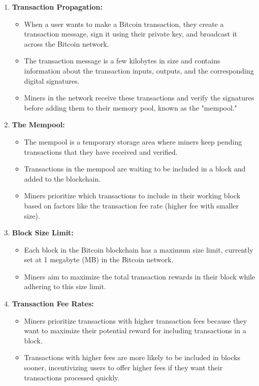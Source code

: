 \begin{enumerate}
    \item \textbf{Transaction Propagation:}
    \begin{itemize}
        \item When a user wants to make a Bitcoin transaction, they create a transaction message, sign it using their private key, and broadcast it across the Bitcoin network.
        \item The transaction message is a few kilobytes in size and contains information about the transaction inputs, outputs, and the corresponding digital signatures.
        \item Miners in the network receive these transactions and verify the signatures before adding them to their memory pool, known as the "mempool."
    \end{itemize}
    \item \textbf{The Mempool:}
    \begin{itemize}
        \item The mempool is a temporary storage area where miners keep pending transactions that they have received and verified.
        \item Transactions in the mempool are waiting to be included in a block and added to the blockchain.
        \item Miners prioritize which transactions to include in their working block based on factors like the transaction fee rate (higher fee with smaller size).
    \end{itemize}
    \item \textbf{Block Size Limit:}
    \begin{itemize}
        \item Each block in the Bitcoin blockchain has a maximum size limit, currently set at 1 megabyte (MB) in the Bitcoin network.
        \item Miners aim to maximize the total transaction rewards in their block while adhering to this size limit.
    \end{itemize}
    \item \textbf{Transaction Fee Rates:}
    \begin{itemize}
        \item Miners prioritize transactions with higher transaction fees because they want to maximize their potential reward for including transactions in a block.
        \item Transactions with higher fees are more likely to be included in blocks sooner, incentivizing users to offer higher fees if they want their transactions processed quickly.

\end{itemize}
\end{enumerate}
